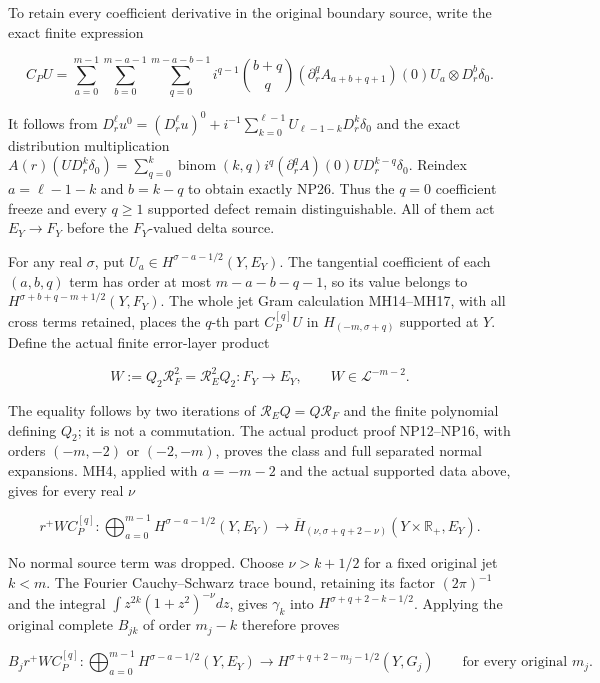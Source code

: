 \documentclass[
  11pt,
]{article}
\begin{document}
To retain every coefficient derivative in the original boundary source,
write the exact finite expression

\[
 C_PU=\sum_{a=0}^{m-1}\sum_{b=0}^{m-a-1}\sum_{q=0}^{m-a-b-1}
   i^{q-1}\binom{b+q}{q}
   (\partial_r^qA_{a+b+q+1})(0)U_a\otimes D_r^b\delta_0.
 \tag{NP26}
\]

It follows from
\(D_r^\ell u^0=(D_r^\ell u)^0+i^{-1}\sum _{k=0}^{\ell -1}U_{\ell -1-k}D_r^k\delta _0\)
and the exact distribution multiplication
\(A(r)(U D_r^k\delta _0)=\sum _{q=0}^k \operatorname{binom}(k,q)i^q(\partial _r^qA)(0)U D_r^{k-q}\delta _0\).
Reindex \(a=\ell -1-k\) and \(b=k-q\) to obtain exactly NP26. Thus the
\(q=0\) coefficient freeze and every \(q\ge1\) supported defect remain
distinguishable. All of them act \(E_Y\to F_Y\) before the
\(F_Y\)-valued delta source.

For any real \(\sigma \), put \(U_a\in H^{\sigma -a-1/2}(Y,E_Y)\). The
tangential coefficient of each \((a,b,q)\) term has order at most
\(m-a-b-q-1\), so its value belongs to \(H^{\sigma +b+q-m+1/2}(Y,F_Y)\).
The whole jet Gram calculation MH14--MH17, with all cross terms
retained, places the \(q\)-th part \(C_P^{[q]}U\) in
\(H_{(-m,\sigma +q)}\) supported at \(Y\). Define the actual finite
error-layer product

\[
 W:=Q_2\mathcal R_F^2=\mathcal R_E^2Q_2:F_Y\to E_Y,
 \qquad W\in\mathcal L^{-m-2}.
 \tag{NP27}
\]

The equality follows by two iterations of
\(\mathcal R _EQ=Q\mathcal R _F\) and the finite polynomial defining
\(Q_2\); it is not a commutation. The actual product proof NP12--NP16,
with orders \((-m,-2)\) or \((-2,-m)\), proves the class and full
separated normal expansions. MH4, applied with \(a=-m-2\) and the actual
supported data above, gives for every real \(\nu \)

\[
 r^+W C_P^{[q]}:
 \bigoplus_{a=0}^{m-1}H^{\sigma-a-1/2}(Y,E_Y)
 \longrightarrow\overline H_{(\nu,\sigma+q+2-\nu)}(Y\times\mathbb R_+,E_Y).
 \tag{NP28}
\]

No normal source term was dropped. Choose \(\nu >k+1/2\) for a fixed
original jet \(k<m\). The Fourier Cauchy--Schwarz trace bound, retaining
its factor \((2\pi )^{-1}\) and the integral
\(\int z^{2k}(1+z^2)^{-\nu }dz\), gives \(\gamma _k\) into
\(H^{\sigma +q+2-k-1/2}\). Applying the original complete \(B_{jk}\) of
order \(m_j-k\) therefore proves

\[
 B_j r^+W C_P^{[q]}:
 \bigoplus_{a=0}^{m-1}H^{\sigma-a-1/2}(Y,E_Y)
 \longrightarrow H^{\sigma+q+2-m_j-1/2}(Y,G_j)
 \qquad\text{for every original }m_j.
 \tag{NP29}
\]
\end{document}
